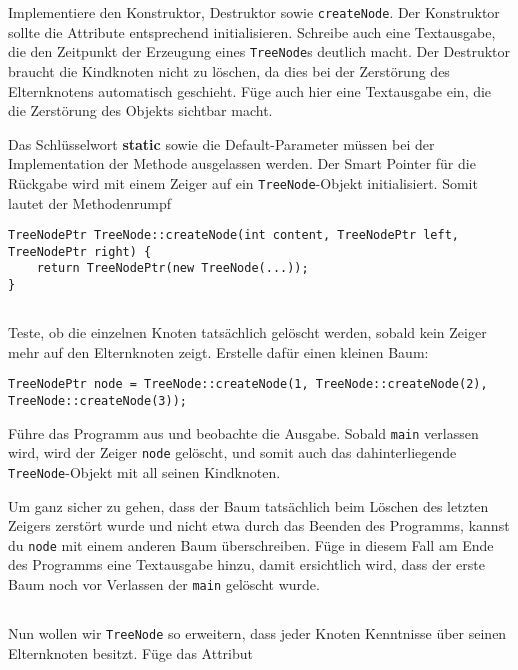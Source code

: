 Implementiere den Konstruktor, Destruktor sowie \texttt{createNode}.
Der Konstruktor sollte die Attribute entsprechend initialisieren.
Schreibe auch eine Textausgabe, die den Zeitpunkt der Erzeugung eines \texttt{TreeNode}s deutlich macht.
Der Destruktor braucht die Kindknoten nicht zu löschen, da dies bei der Zerstörung des Elternknotens automatisch geschieht.
Füge auch hier eine Textausgabe ein, die die Zerstörung des Objekts sichtbar macht.

Das Schlüsselwort \textbf{static} sowie die Default-Parameter müssen bei der Implementation der Methode ausgelassen werden.
Der Smart Pointer für die Rückgabe wird mit einem Zeiger auf ein \texttt{TreeNode}-Objekt initialisiert. Somit lautet der Methodenrumpf

\begin{lstlisting}
TreeNodePtr TreeNode::createNode(int content, TreeNodePtr left, TreeNodePtr right) {
	return TreeNodePtr(new TreeNode(...));
}
\end{lstlisting}

\subsection{}
Teste, ob die einzelnen Knoten tatsächlich gelöscht werden, sobald kein Zeiger mehr auf den Elternknoten zeigt.
Erstelle dafür einen kleinen Baum:

\begin{lstlisting}
TreeNodePtr node = TreeNode::createNode(1, TreeNode::createNode(2), TreeNode::createNode(3));
\end{lstlisting}

Führe das Programm aus und beobachte die Ausgabe.
Sobald \texttt{main} verlassen wird, wird der Zeiger \texttt{node} gelöscht, und somit auch das dahinterliegende \texttt{TreeNode}-Objekt mit all seinen Kindknoten.

Um ganz sicher zu gehen, dass der Baum tatsächlich beim Löschen des letzten Zeigers zerstört wurde und nicht etwa durch das Beenden des Programms, kannst du \texttt{node} mit einem anderen Baum überschreiben.
Füge in diesem Fall am Ende des Programms eine Textausgabe hinzu, damit ersichtlich wird, dass der erste Baum noch vor Verlassen der \texttt{main} gelöscht wurde.

\subsection{}
Nun wollen wir \texttt{TreeNode} so erweitern, dass jeder Knoten Kenntnisse über seinen Elternknoten besitzt.
Füge das Attribut

